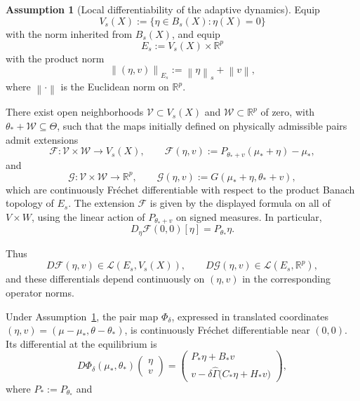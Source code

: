 \documentclass[11pt]{article}
\theoremstyle{definition}
\newtheorem{assumption}[theorem]{Assumption}
\theoremstyle{remark}
\newcommand{\ProbThetaOne}{\mathcal{P}_{\Theta}^{1}}
\newcommand{\norm}[1]{\left\lVert #1\right\rVert}
\newcommand{\R}{\mathbb{R}}
\newcommand{\ThetaSet}{\Theta}
\newcommand{\Gammahat}{\widehat{\Gamma}}
\newcommand{\Z}{\mathsf{Z}}
\begin{document}

\begin{assumption}[Local differentiability of the adaptive dynamics]
\label{ass:local-adaptive-C1}
Equip
\[
  V_s(X):=\{\eta\in B_s(X):\eta(X)=0\}
\]
with the norm inherited from \(B_s(X)\), and equip
\[
  E_s:=V_s(X)\times\R^p
\]
with the product norm
\[
  \norm{(\eta,v)}_{E_s}
  :=\norm{\eta}_s+\norm{v},
\]
where \(\norm{\cdot}\) is the Euclidean norm on \(\R^p\).

There exist open neighborhoods
\(\mathcal V\subset V_s(X)\) and
\(\mathcal W\subset\R^p\) of zero, with
\(\theta_*+\mathcal W\subseteq\ThetaSet\), such that the maps
initially defined on physically admissible pairs admit extensions
\[
  \mathcal F:\mathcal V\times\mathcal W\longrightarrow V_s(X),
  \qquad
  \mathcal F(\eta,v)
  :=
  P_{\theta_*+v}(\mu_*+\eta)-\mu_*,
\]
and
\[
  \mathcal G:\mathcal V\times\mathcal W\longrightarrow\R^p,
  \qquad
  \mathcal G(\eta,v)
  :=
  G(\mu_*+\eta,\theta_*+v),
\]
which are continuously Fr\'echet differentiable with respect to the
product Banach topology of \(E_s\).  
The extension $\mathcal F$ is given by the displayed formula
on all of $V\times W$, using the linear action of
$P_{\theta_*+v}$ on signed measures. In particular,
\[
  D_\eta\mathcal F(0,0)[\eta]=P_{\theta_*}\eta.
\]

Thus
\[
  D\mathcal F(\eta,v)\in
  \mathcal L(E_s,V_s(X)),
  \qquad
  D\mathcal G(\eta,v)\in
  \mathcal L(E_s,\R^p),
\]
and these differentials depend continuously on \((\eta,v)\) in the
corresponding operator norms.
\end{assumption}

Under Assumption~\ref{ass:local-adaptive-C1}, the pair map
\(\Phi_\delta\), expressed in translated coordinates
\((\eta,v)=(\mu-\mu_*,\theta-\theta_*)\), is continuously Fr\'echet
differentiable near \((0,0)\).  Its differential at the equilibrium is
\begin{equation}
 D\Phi_\delta(\mu_*,\theta_*)
 \begin{pmatrix}\eta\\ v\end{pmatrix}
 =
 \begin{pmatrix}
   P_*\eta+B_*v\\[1mm]
   v-\delta\Gammahat\bigl(C_*\eta+H_*v\bigr)
 \end{pmatrix},
 \label{eq:block-linearization}
\end{equation}
where \(P_*:=P_{\theta_*}\) and
\end{document}
